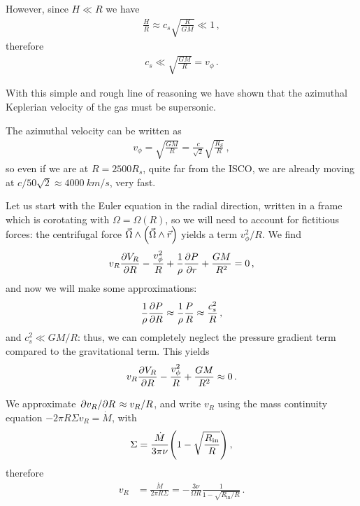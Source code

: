 \documentclass[main.tex]{subfiles}
\begin{document}
However, since \(H \ll R\) we have 
%
\begin{align}
\frac{H}{R} \approx c_s \sqrt{ \frac{R}{GM}} \ll 1
\,,
\end{align}
%
therefore 
%
\begin{align}
c_s \ll \sqrt{ \frac{GM}{R}} = v_\phi 
\,.
\end{align}

With this simple and rough line of reasoning we have shown that the azimuthal Keplerian velocity of the gas must be supersonic. 

The azimuthal velocity can be written as 
%
\begin{align}
v_\phi = \sqrt{ \frac{GM}{R}} = \frac{c}{\sqrt{2}} \sqrt{ \frac{R_S}{R}}
\,,
\end{align}
%
so even if we are at \(R = 2500 R_s\), quite far from the ISCO, we are already moving at \(c/ 50 \sqrt{2} \approx \SI{4000}{km/s}\), very fast. 

Let us start with the Euler equation in the radial direction, written in a frame which is corotating with \(\Omega = \Omega (R)\), so we will need to account for fictitious forces: the centrifugal force \(\vec{\Omega} \wedge \qty(\vec{\Omega} \wedge \vec{r})\) yields a term \(v_\phi^2 / R\).
We find 
%
\begin{align}
v_R \pdv{V_R}{R} - \frac{v_\phi^2}{R} + \frac{1}{\rho } \pdv{P}{r} + \frac{GM}{R^2} = 0
\,,
\end{align}
%
and now we will make some approximations: 
%
\begin{align}
\frac{1}{\rho } \pdv{P}{R} \approx \frac{1}{\rho } \frac{P}{R} \approx \frac{c_s^2}{R}
\,,
\end{align}
%
and \(c_s^2 \ll GM/R \): thus, we can completely neglect the pressure gradient term compared to the gravitational term. 
This yields 
%
\begin{align}
v_R \pdv{V_R}{R} - \frac{v_\phi^2}{R} + \frac{GM}{R^2} \approx 0
\,.
\end{align}

We approximate \(\pdv*{v_R}{R} \approx v_R / R\), and write \(v_R\) using the mass continuity equation \(-2 \pi R \Sigma v_R = \dot{M}\), with 
%
\begin{align}
\Sigma = \frac{\dot{M}}{3 \pi \nu } \qty(1 - \sqrt{\frac{R _{\text{in}}}{R}})
\,,
\end{align}
%
therefore 
%
\begin{align}
v_R &= \frac{\dot{M}}{2 \pi R \Sigma } = - \frac{3 \nu }{\Omega R} \frac{1}{1 - \sqrt{R _{\text{in}} / R}}
\,.
\end{align}
\end{document}
